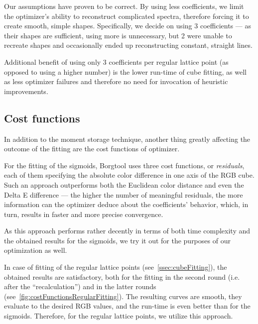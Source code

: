Our assumptions have proven to be correct. By using less coefficients, we limit the optimizer's ability to reconstruct complicated spectra, therefore forcing it to create smooth, simple shapes. Specifically, we decide on using 3 coefficients --- as their shapes are sufficient, using more is unnecessary, but 2 were unable to recreate shapes and occasionally ended up reconstructing constant, straight lines.

Additional benefit of using only 3 coefficients per regular lattice point (as opposed to using a higher number) is the lower run-time of cube fitting, as well as less optimizer failures and therefore no need for invocation of heuristic improvements.

\subsection{Cost functions} \label{ssec:costFunctions}

In addition to the moment storage technique, another thing greatly affecting the outcome of the fitting are the cost functions of optimizer.

For the fitting of the sigmoids, Borgtool uses three cost functions, or \emph{residuals}, each of them specifying the absolute color difference in one axis of the RGB cube. Such an approach outperforms both the Euclidean color distance and even the Delta E difference --- the higher the number of meaningful residuals, the more information can the optimizer deduce about the coefficients' behavior, which, in turn, results in faster and more precise convergence.

As this approach performs rather decently in terms of both time complexity and the obtained results for the sigmoids, we try it out for the purposes of our optimization as well. 

In case of fitting of the regular lattice points (see~\cref{ssec:cubeFitting}), the obtained results are satisfactory, both for the fitting in the second round (i.e. after the ``recalculation'') and in the latter rounds (see~\cref{fig:costFunctionsRegularFitting}). The resulting curves are smooth, they evaluate to the desired RGB values, and the run-time is even better than for the sigmoids. Therefore, for the regular lattice points, we utilize this approach.

